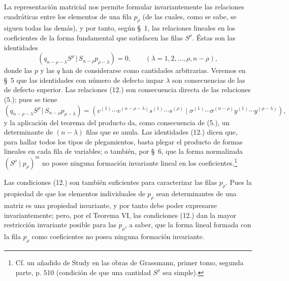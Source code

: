 \documentclass[11pt]{article}
\newcommand{\pair}[2]{(#1\,|\,#2)}
\begin{document}
La representación matricial nos permite formular invariantemente las relaciones cuadráticas entre los elementos de una fila $p_\rho$ (de las cuales, como se sabe, se siguen todas las demás), y por tanto, según \S\ 1, las relaciones lineales en los coeficientes de la forma fundamental que satisfacen las filas $S^\rho$. Éstas son las identidades
\begin{equation}
 \pair{q_{n-\rho-\lambda}S^\rho}{S_{n-\rho}p_{\rho-\lambda}}=0,
 \qquad (\lambda=1,2,\ldots,\rho,n-\rho),
\tag{12}
\end{equation}
donde las $p$ y las $q$ han de considerarse como cantidades arbitrarias. Veremos en \S\ 5 que las identidades con número de defecto impar $\lambda$ son consecuencias de las de defecto superior. Las relaciones (12.) son consecuencia directa de las relaciones (5.); pues se tiene
\[
 \pair{q_{n-\rho-\lambda}S^\rho}{S_{n-\rho}p_{\rho-\lambda}}
 =(v^{(1)}\cdots v^{(n-\rho-\lambda)}s^{(1)}\cdots s^{(\rho)}\mid \sigma^{(1)}\cdots\sigma^{(n-\rho)}y^{(1)}\cdots y^{(\rho-\lambda)}),
\]
y la aplicación del teorema del producto da, como consecuencia de (5.), un determinante de $(n-\lambda)$ filas que se anula. Las identidades (12.) dicen que, para hallar todos los tipos de plegamientos, basta plegar el producto de formas lineales en cada fila de variables; o también, por \S\ 6, que la forma normalizada $(S^\rho\mid p_\rho)^m$ no posee ninguna formación invariante lineal en los coeficientes.\footnote{Cf. un añadido de Study en las obras de Grassmann, primer tomo, segunda parte, p. 510 (condición de que una cantidad $S^\rho$ sea simple).}

Las condiciones (12.) son también suficientes para caracterizar las filas $p_\rho$. Pues la propiedad de que los elementos individuales de $p_\rho$ sean determinantes de una matriz es una propiedad invariante, y por tanto debe poder expresarse invariantemente; pero, por el Teorema VI, las condiciones (12.) dan la mayor restricción invariante posible para las $p_\rho$, a saber, que la forma lineal formada con la fila $p_\rho$ como coeficientes no posea ninguna formación invariante.
\end{document}
